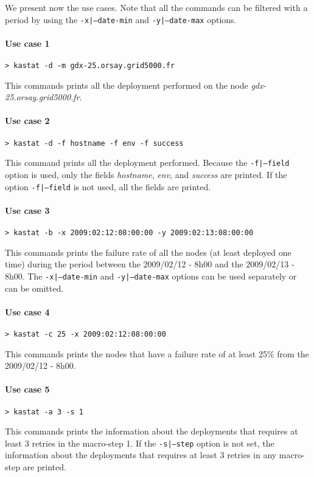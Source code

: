\documentclass[a4wide,10pt,oneside]{book}
\begin{document}
We present now the use cases. Note that all the commands can be filtered with a period by using the \texttt{-x|--date-min} and \texttt{-y|--date-max} options.
\paragraph{Use case 1}
\begin{verbatim}
> kastat -d -m gdx-25.orsay.grid5000.fr
\end{verbatim}
This commands prints all the deployment performed on the node \textit{gdx-25.orsay.grid5000.fr}.

\paragraph{Use case 2}
\begin{verbatim}
> kastat -d -f hostname -f env -f success
\end{verbatim}
This command prints all the deployment performed. Because the \texttt{-f|--field} option is used, only the fields \textit{hostname}, \textit{env}, and \textit{success} are printed. If the option \texttt{-f|--field} is not used, all the fields are printed.

\paragraph{Use case 3}
\begin{verbatim}
> kastat -b -x 2009:02:12:08:00:00 -y 2009:02:13:08:00:00
\end{verbatim}
This commands prints the failure rate of all the nodes (at least deployed one time) during the period between the 2009/02/12 - 8h00 and the 2009/02/13 - 8h00. The \texttt{-x|--date-min} and \texttt{-y|--date-max} options can be used separately or can be omitted.

\paragraph{Use case 4}
\begin{verbatim}
> kastat -c 25 -x 2009:02:12:08:00:00
\end{verbatim}
This commands prints the nodes that have a failure rate of at least 25\% from the 2009/02/12 - 8h00.

\paragraph{Use case 5}
\begin{verbatim}
> kastat -a 3 -s 1
\end{verbatim}
This commands prints the information about the deployments that requires at least 3 retries in the macro-step 1. If the \texttt{-s|--step} option is not set, the information about the deployments that requires at least 3 retries in any macro-step are printed.
\end{document}
